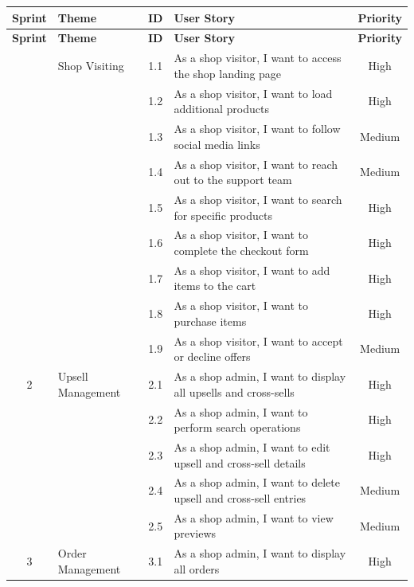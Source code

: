 \begin{longtable}{|c|p{6cm}|c|p{6cm}|c|}
\hline
\textbf{Sprint} & \textbf{Theme} & \textbf{ID} & \textbf{User Story} & \textbf{Priority} \\ 
\hline
\endfirsthead

\hline
\textbf{Sprint} & \textbf{Theme} & \textbf{ID} & \textbf{User Story} & \textbf{Priority} \\ 
\hline
\endhead

\hline
\endfoot

\hline
\endlastfoot

\multirow{1}{*}{1} & \multirow{1}{*}{Shop Visiting} & 1.1 & As a shop visitor, I want to access the shop landing page & High \\ \cline{3-5}
& & 1.2 & As a shop visitor, I want to load additional products & High \\ \cline{3-5}
& & 1.3 & As a shop visitor, I want to follow social media links & Medium \\ \cline{3-5}
& & 1.4 & As a shop visitor, I want to reach out to the support team & Medium \\ \cline{3-5}
& & 1.5 & As a shop visitor, I want to search for specific products & High \\ \cline{3-5}
& & 1.6 & As a shop visitor, I want to complete the checkout form & High \\ \cline{3-5}
& & 1.7 & As a shop visitor, I want to add items to the cart & High \\ \cline{3-5}
& & 1.8 & As a shop visitor, I want to purchase items & High \\ \cline{3-5}
& & 1.9 & As a shop visitor, I want to accept or decline offers & Medium \\ \hline
\multirow{1}{*}{2} & \multirow{1}{*}{Upsell Management} & 2.1 & As a shop admin, I want to display all upsells and cross-sells & High \\ \cline{3-5}
& & 2.2 & As a shop admin, I want to perform search operations & High \\ \cline{3-5}
& & 2.3 & As a shop admin, I want to edit upsell and cross-sell details & High \\ \cline{3-5}
& & 2.4 & As a shop admin, I want to delete upsell and cross-sell entries & Medium \\ \cline{3-5}
& & 2.5 & As a shop admin, I want to view previews & Medium \\ \hline
\multirow{1}{*}{3} & \multirow{1}{*}{Order Management} & 3.1 & As a shop admin, I want to display all orders & High \\ \cline{3-5}

\end{longtable}
